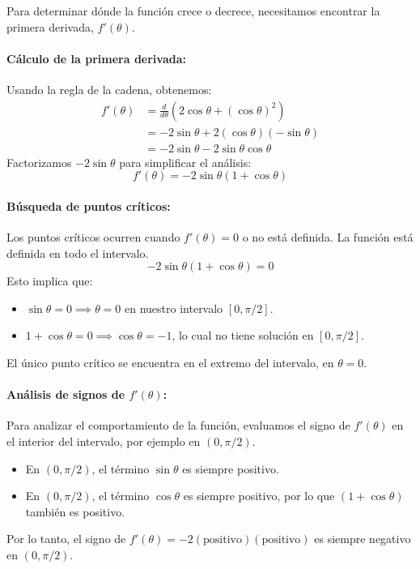 \documentclass[12pt, letterpaper]{article}
\begin{document}
Para determinar dónde la función crece o decrece, necesitamos encontrar la primera derivada, $f'(\theta)$.

\paragraph{Cálculo de la primera derivada:}
Usando la regla de la cadena, obtenemos:
\begin{align*}
f'(\theta) &= \frac{d}{d\theta}(2\cos\theta + (\cos\theta)^2) \\
&= -2\sin\theta + 2(\cos\theta)(-\sin\theta) \\
&= -2\sin\theta - 2\sin\theta\cos\theta
\end{align*}
Factorizamos $-2\sin\theta$ para simplificar el análisis:
$$ f'(\theta) = -2\sin\theta(1 + \cos\theta) $$

\paragraph{Búsqueda de puntos críticos:}
Los puntos críticos ocurren cuando $f'(\theta) = 0$ o no está definida. La función está definida en todo el intervalo.
$$ -2\sin\theta(1 + \cos\theta) = 0 $$
Esto implica que:
\begin{itemize}
    \item $\sin\theta = 0 \implies \theta = 0$ en nuestro intervalo $[0, \pi/2]$.
    \item $1 + \cos\theta = 0 \implies \cos\theta = -1$, lo cual no tiene solución en $[0, \pi/2]$.
\end{itemize}
El único punto crítico se encuentra en el extremo del intervalo, en $\theta = 0$.

\paragraph{Análisis de signos de $f'(\theta)$:}
Para analizar el comportamiento de la función, evaluamos el signo de $f'(\theta)$ en el interior del intervalo, por ejemplo en $(0, \pi/2)$.
\begin{itemize}
    \item En $(0, \pi/2)$, el término $\sin\theta$ es siempre positivo.
    \item En $(0, \pi/2)$, el término $\cos\theta$ es siempre positivo, por lo que $(1 + \cos\theta)$ también es positivo.
\end{itemize}
Por lo tanto, el signo de $f'(\theta) = -2(\text{positivo})(\text{positivo})$ es siempre negativo en $(0, \pi/2)$.
\end{document}
